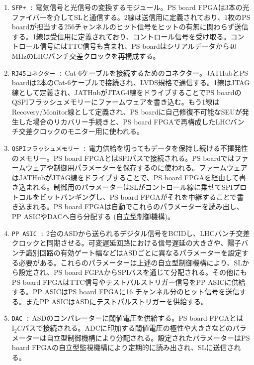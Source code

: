 \baselineskip

\begin{enumerate}
    \item \texttt{SFP+ :} 電気信号と光信号の変換するモジュール。PS board FPGAは3本の光ファイバーを介してSLと通信する。2線は送信用に定義されており、1枚のPS boardが担当する256チャンネルのヒット信号をヒットの有無に関わらず送信する。1線は受信用に定義されており、コントロール信号を受け取る。コントロール信号にはTTC信号も含まれ、PS boardはシリアルデータから40 MHzのLHCバンチ交差クロックを再構成する。
    \baselineskip

    \item \texttt{RJ45コネクター :} Cat-6ケーブルを接続するためのコネクター。JATHubとPS boardは2本のCat-6ケーブルで接続され、LVDS規格で通信する。1線はJTAG線として定義され、JATHubがJTAG4線をドライブすることでPS boardのQSPIフラッシュメモリーにファームウェアを書き込む。もう1線はRecovery/Monitor線として定義され、PS boardに自己修復不可能なSEUが発生した場合のリカバリー手続きと、PS board FPGAで再構成したLHCバンチ交差クロックのモニター用に使われる。
    \baselineskip

    \item \texttt{QSPIフラッシュメモリー :} 電力供給を切ってもデータを保持し続ける不揮発性のメモリー。PS board FPGAとはSPIバスで接続される。PS boardではファームウェアや制御用パラメーターを保存するのに使われる。ファームウェアはJATHubがJTAG線をドライブすることで、PS board FPGAを経由して書き込まれる。制御用のパラメーターはSLがコントロール線に乗せてSPIプロトコルをビットバンギングし、PS board FPGAがそれを中継することで書き込まれる。PS board FPGAは自動でこれらのパラメーターを読み出し、PP ASICやDACへ自ら分配する (自立型制御機構)。
    \baselineskip

    \item \texttt{PP ASIC :} 2台のASDから送られるデジタル信号をBCIDし、LHCバンチ交差クロックと同期させる。可変遅延回路における信号遅延の大きさや、陽子バンチ識別回路の有効ゲート幅などはASDごとに異なるパラメーターを設定する必要がある。これらのパラメーターは上述の自立型制御機構により、SLから設定され、PS board FGPAからSPIバスを通じて分配される。その他にもPS board FPGAはTTC信号やテストパルストリガー信号をPP ASICに供給する。PP ASICはPS board FPGAに16 チャンネル分のヒット信号を送信する。またPP ASICはASDにテストパルストリガーを供給する。
    \baselineskip            

    \item \texttt{DAC :} ASDのコンパレーターに閾値電圧を供給する。PS board FPGAとは$\mathrm{I_{2}}C$バスで接続される。ADCに印加する閾値電圧の極性や大きさなどのパラメーターは自立型制御機構により分配される。設定されたパラメーターはPS board FPGAの自立型監視機構により定期的に読み出され、SLに送信される。
    \baselineskip


\end{enumerate}
